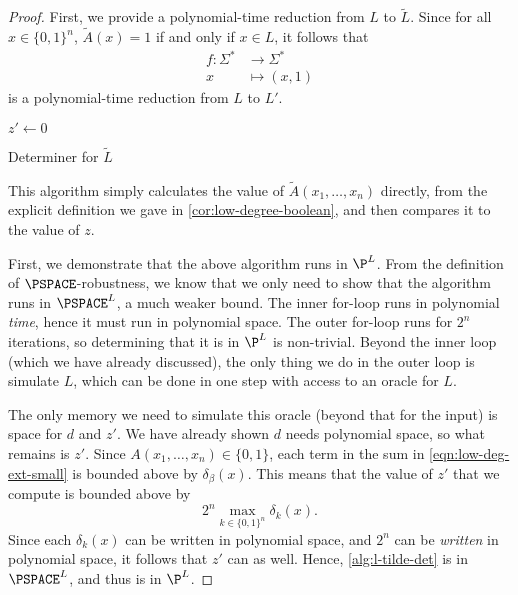 \documentclass[english]{reedthesis}
\theoremstyle{plain}
\theoremstyle{definition}
\theoremstyle{remark}
\begin{document}
\begin{proof}
  First, we provide a polynomial-time reduction from $L$ to $\tilde{L}$. Since
  for all $x \in \{0, 1\}^{n}$, $\tilde{A}(x) = 1$ if and only if $x \in L$, it
  follows that
  \begin{equation}
    \begin{aligned}
      f: \Sigma^{*} &\rightarrow \Sigma^{*} \\
      x &\mapsto (x, 1)
    \end{aligned}
  \end{equation}
  is a polynomial-time reduction from $L$ to $L'$.

  \begin{algorithm}[H]
    $z' \leftarrow 0$\;
    \;
    \caption{Determiner for $\tilde{L}$}\label{alg:l-tilde-det}
  \end{algorithm}

  This algorithm simply calculates the value of $\tilde{A}(x_{1}, \ldots, x_{n})$
  directly, from the explicit definition we gave in
  \cref{cor:low-degree-boolean}, and then compares it to the value of $z$.

  First, we demonstrate that the above algorithm runs in $\P^{L}$. From the
  definition of $\PSPACE$-robustness, we know that we only need to show that the
  algorithm runs in $\PSPACE^{L}$, a much weaker bound. The inner for-loop runs
  in polynomial \emph{time}, hence it must run in polynomial space. The outer
  for-loop runs for $2^{n}$ iterations, so determining that it is in $\P^{L}$ is
  non-trivial. Beyond the inner loop (which we have already discussed), the only
  thing we do in the outer loop is simulate $L$, which can be done in one step
  with access to an oracle for $L$.

  The only memory we need to simulate this oracle (beyond that for the input) is
  space for $d$ and $z'$. We have already shown $d$ needs polynomial space, so
  what remains is $z'$. Since $A(x_{1}, \ldots, x_{n}) \in \{0, 1\}$, each term in the
  sum in \cref{eqn:low-deg-ext-small} is bounded above by $\delta_{\beta}(x)$. This means
  that the value of $z'$ that we compute is bounded above by
  \begin{equation}
    2^{n}\max_{k \in \{0, 1\}^{n}}\delta_{k}(x).
  \end{equation}
  Since each $\delta_{k}(x)$ can be written in polynomial space, and $2^{n}$ can be
  \emph{written} in polynomial space, it follows that $z'$ can as well. Hence,
  \cref{alg:l-tilde-det} is in $\PSPACE^{L}$, and thus is in $\P^{L}$.


\end{proof}
\end{document}
